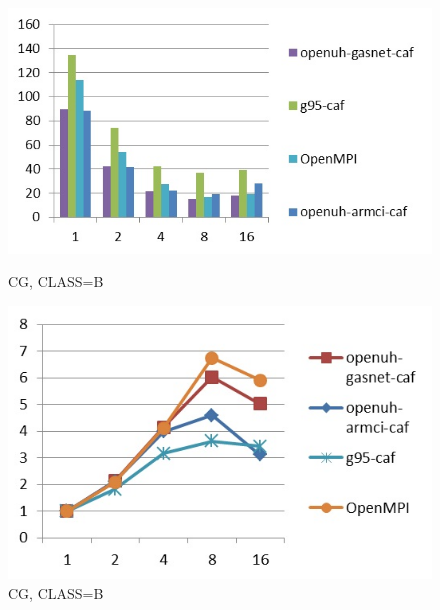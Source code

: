 \begin{figure}[ht]
\begin{minipage}[b]{0.45\linewidth}
\centering
\includegraphics[width=\textwidth]{./figures/cg_B_time.jpg}
\caption{CG, CLASS=B}
\label{fig:figure1}
\end{minipage}
\hspace{0.5cm}
\begin{minipage}[b]{0.45\linewidth}
\centering
\includegraphics[width=\textwidth]{./figures/cg_B_scalability.jpg}
\caption{CG, CLASS=B}
\label{fig:figure2}
\end{minipage}
\end{figure}


